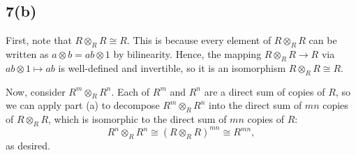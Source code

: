 \documentclass[12pt, reqno]{amsart}
\begin{document}
\subsection*{7(b)}
First, note that $R \otimes_R R \cong R$.
This is because every element of $R \otimes_R R$ can be written as
$a \otimes b = ab \otimes 1$ by bilinearity.
Hence, the mapping $R \otimes_R R \to R$ via $ab \otimes 1 \mapsto ab$ is
well-defined and invertible, so it is an isomorphism $R \otimes_R R \cong R$. 

Now, consider $R^m \otimes_R R^n$. Each of $R^m$ and $R^n$ are a direct sum of
copies of $R$, so we can apply part (a) to decompose $R^m \otimes_R R^n$ into
the direct sum of $mn$ copies of $R \otimes_R R$, which is isomorphic to the
direct sum of $mn$ copies of $R$:
\[ 
R^n \otimes_R R^n \cong (R \otimes_R R)^{mn} \cong  R^{mn}, 
\] 
as desired.
\end{document}
